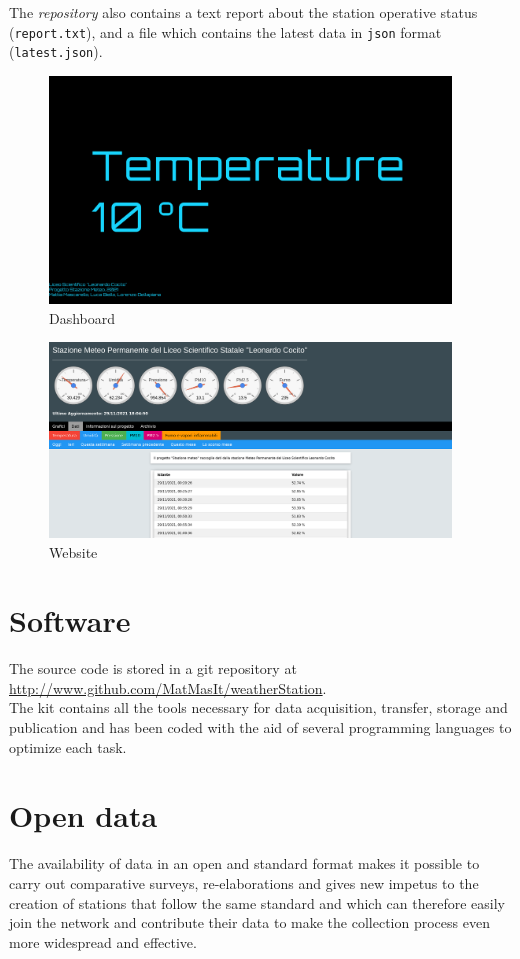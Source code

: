 \documentclass[12pt, a4paper]{article}
\begin{document}
The \emph{repository} also contains a text report about the station operative status (\texttt{report.txt}), and a file which contains the latest data in \texttt{json} format (\texttt{latest.json}).
\clearpage
\begin{figure}[!h]
	\centering
	\includegraphics[width=0.95\textwidth]{dash.png}
	\caption{Dashboard}
	\label{fig:dash}
\end{figure}

\begin{figure}[!h]
	\centering
	\includegraphics[width=0.95\textwidth]{web.png}
	\caption{Website}
	\label{fig:web}
\end{figure}
\clearpage

\section{Software}
The source code is stored in a git repository at  \url{http://www.github.com/MatMasIt/weatherStation}.\\
The kit contains all the tools necessary for data acquisition, transfer, storage and publication and has been coded with the aid of several programming languages to optimize each task.
	\section{Open data}
The availability of data in an open and standard format makes it possible to carry out comparative surveys, re-elaborations and gives new impetus to the creation of stations that follow the same standard and which can therefore easily join the network and contribute their data to make the collection process even more widespread and effective.
\end{document}
